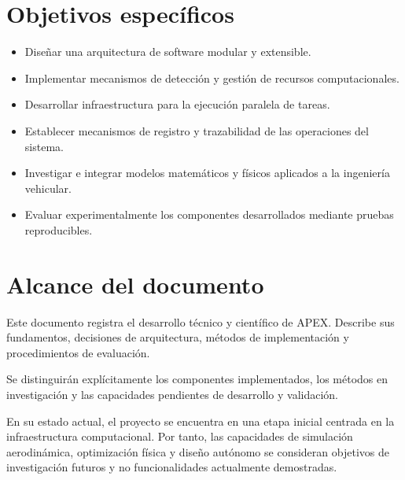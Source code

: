 \section{Objetivos específicos}

\begin{itemize}
    \item Diseñar una arquitectura de software modular
    y extensible.

    \item Implementar mecanismos de detección y gestión
    de recursos computacionales.

    \item Desarrollar infraestructura para la ejecución
    paralela de tareas.

    \item Establecer mecanismos de registro y trazabilidad
    de las operaciones del sistema.

    \item Investigar e integrar modelos matemáticos
    y físicos aplicados a la ingeniería vehicular.

    \item Evaluar experimentalmente los componentes
    desarrollados mediante pruebas reproducibles.
\end{itemize}

\section{Alcance del documento}

Este documento registra el desarrollo técnico y científico
de APEX. Describe sus fundamentos, decisiones de arquitectura,
métodos de implementación y procedimientos de evaluación.

Se distinguirán explícitamente los componentes implementados,
los métodos en investigación y las capacidades pendientes
de desarrollo y validación.

En su estado actual, el proyecto se encuentra en una etapa
inicial centrada en la infraestructura computacional.
Por tanto, las capacidades de simulación aerodinámica,
optimización física y diseño autónomo se consideran
objetivos de investigación futuros y no funcionalidades
actualmente demostradas.
